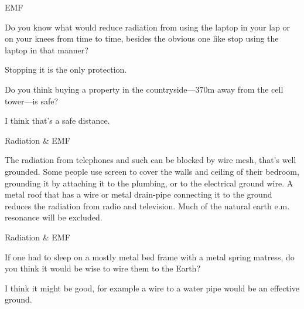 \documentclass[11pt,oneside,openany,extrafontsizes]{memoir}
\begin{document}
\begin{emailexchange}{EMF}

    \begin{question}
        Do you know what would reduce radiation from using the laptop in your lap or on your knees from time to time, besides the obvious one like stop using the laptop in that manner?
    \end{question}

    \begin{answer}
      Stopping it is the only protection.
    \end{answer}
	
    \begin{question}
        Do you think buying a property in the countryside---370m away from the cell tower---is safe?
    \end{question}

    \begin{answer}
      I think that's a safe distance.
    \end{answer}
\end{emailexchange}

\begin{standalonequote}{Radiation \& EMF}

    \begin{answer}
      The radiation from telephones and such can be blocked by wire mesh, that's well grounded. Some people use screen to cover the walls and ceiling of their bedroom, grounding it by attaching it to the plumbing, or to the electrical ground wire. A metal roof that has a wire or metal drain-pipe connecting it to the ground reduces the radiation from radio and television. Much of the natural earth e.m. resonance will be excluded.
    \end{answer}
\end{standalonequote}

\begin{qaexchange}{Radiation \& EMF}

    \begin{question}
        If one had to sleep on a mostly metal bed frame with a metal spring matress, do you think it would be wise to wire them to the Earth?
    \end{question}

    \begin{answer}
      I think it might be good, for example a wire to a water pipe would be an effective ground.
    \end{answer}
\end{qaexchange}
\end{document}
